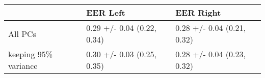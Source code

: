 \begin{tabular}{lll}
\toprule
{} &                    EER Left &                   EER Right \\
\midrule
All PCs              &  0.29 +/- 0.04 (0.22, 0.34) &  0.28 +/- 0.04 (0.21, 0.32) \\
keeping 95\% variance &  0.30 +/- 0.03 (0.25, 0.35) &  0.28 +/- 0.04 (0.23, 0.32) \\
\bottomrule
\end{tabular}
